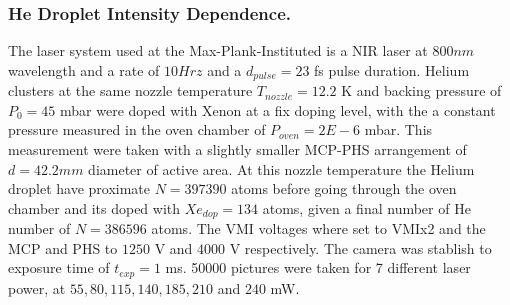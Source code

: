 \subsubsection{He Droplet  Intensity Dependence.}

The laser system used at the Max-Plank-Instituted is a NIR laser at $800nm$ wavelength and a rate of $10Hrz$ and a $d_{pulse}=23$ fs pulse duration. Helium clusters at the same nozzle temperature $T_{nozzle}=12.2$ K and  backing pressure of $P_{0}=45$ mbar were doped with Xenon at a fix doping level, with the a constant pressure measured in the oven chamber of $P_{oven}=2E-6$ mbar. This measurement were taken with a slightly smaller MCP-PHS arrangement of $d=42.2mm$ diameter of active area. At this nozzle temperature the Helium droplet have proximate $N=397390$ atoms before going through the oven chamber and its doped with $Xe_{dop}=134$ atoms, given a final number of He number of $N=386596$ atoms. The VMI voltages where set to VMIx2 and the MCP and PHS to $1250$ V and $4000$ V respectively. The camera was stablish to exposure time of $t_{exp}=1$ ms. 50000 pictures were taken for 7 different laser power, at $55,80,115,140,185,210$ and $240$ mW. 

